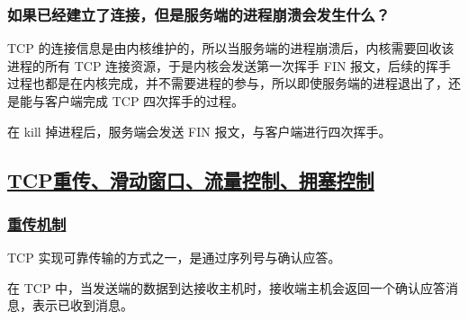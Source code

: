 \documentclass[11pt]{article}
\begin{document}
\subsubsection{如果已经建立了连接，但是服务端的进程崩溃会发生什么？}
\label{sec:org9f1d7ec}
TCP 的连接信息是由内核维护的，所以当服务端的进程崩溃后，内核需要回收该进程的所有 TCP 连接资源，于是内核会发送第一次挥手 FIN 报文，后续的挥手过程也都是在内核完成，并不需要进程的参与，所以即使服务端的进程退出了，还是能与客户端完成 TCP 四次挥手的过程。

在 kill 掉进程后，服务端会发送 FIN 报文，与客户端进行四次挥手。
\subsection{\underline{TCP重传、滑动窗口、流量控制、拥塞控制}}
\label{sec:org25bc887}

\subsubsection{\underline{重传机制}}
\label{sec:orga19a3bf}

TCP 实现可靠传输的方式之一，是通过序列号与确认应答。

在 TCP 中，当发送端的数据到达接收主机时，接收端主机会返回一个确认应答消息，表示已收到消息。
\end{document}
